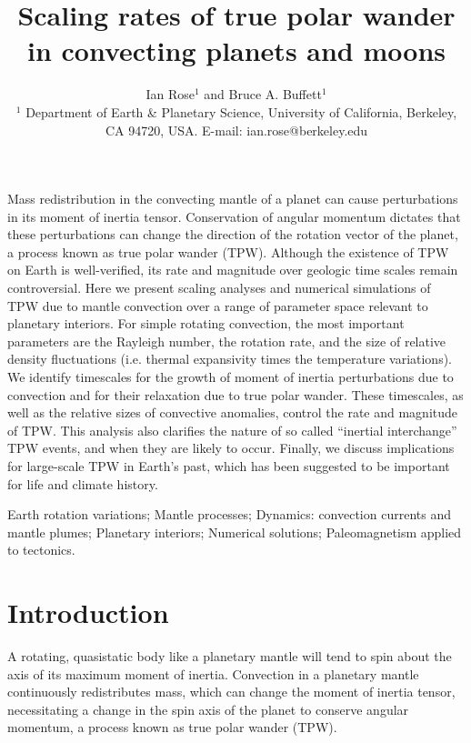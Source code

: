 \documentclass[extra,mreferee]{gji}
\title[TPW Rates]
  {Scaling rates of true polar wander in convecting planets and moons}
\author[I. Rose and B. Buffett]
  {Ian Rose$^1$ and Bruce A. Buffett$^1$ \\
  $^1$ Department of Earth \& Planetary Science, University of California, Berkeley, CA 94720, USA.  E-mail: ian.rose@berkeley.edu
  }
\date{}
\begin{document}
\label{firstpage}

\maketitle

\begin{summary}
Mass redistribution in the convecting mantle of a planet can cause perturbations in its moment of inertia tensor. 
Conservation of angular momentum dictates that these perturbations can change the direction of the rotation vector of the planet, a process known as true polar wander (TPW). 
Although the existence of TPW on Earth is well-verified, its rate and magnitude over geologic time scales remain controversial. 
Here we present scaling analyses and numerical simulations of TPW due to mantle convection over a range of parameter space relevant to planetary interiors. 
For simple rotating convection, the most important parameters are the Rayleigh number, the rotation rate, and the size of relative density fluctuations (i.e. thermal expansivity times the temperature variations). 
We identify timescales for the growth of moment of inertia perturbations due to convection and for their relaxation due to true polar wander. 
These timescales, as well as the relative sizes of convective anomalies, control the rate and magnitude of TPW.
This analysis also clarifies the nature of so called ``inertial interchange'' TPW events, and when they are likely to occur.
Finally, we discuss implications for large-scale TPW in Earth's past, which has been suggested to be important for life and climate history.
\end{summary}

\begin{keywords}
Earth rotation variations; Mantle processes; Dynamics: convection currents and mantle plumes; Planetary interiors; Numerical solutions; Paleomagnetism applied to tectonics.
\end{keywords}

\section{Introduction}
\label{sec:intro}

A rotating, quasistatic body like a planetary mantle will tend to spin about the axis of its maximum moment of inertia.
Convection in a planetary mantle continuously redistributes mass, which can change the moment of inertia tensor, necessitating a change in the spin axis of the planet to conserve angular momentum, a process known as true polar wander (TPW).
\end{document}
